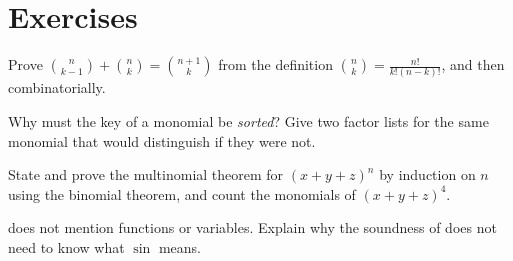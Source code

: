 \section{Exercises}

\begin{exercisebox}
  Prove $\binom{n}{k-1} + \binom{n}{k} = \binom{n+1}{k}$ from the definition
  $\binom{n}{k} = \frac{n!}{k!(n-k)!}$, and then combinatorially.
\end{exercisebox}

\begin{exercisebox}[Keys]
  Why must the key of a monomial be \emph{sorted}? Give two factor lists for the same monomial
  that  would distinguish if they were not.
\end{exercisebox}

\begin{exercisebox}[Multinomial]
  State and prove the multinomial theorem for $(x + y + z)^n$ by induction on $n$ using the
  binomial theorem, and count the monomials of $(x + y + z)^{4}$.
\end{exercisebox}

\begin{exercisebox}
   does not mention functions or variables. Explain why the soundness of  does
  not need to know what $\sin$ means.
\end{exercisebox}

